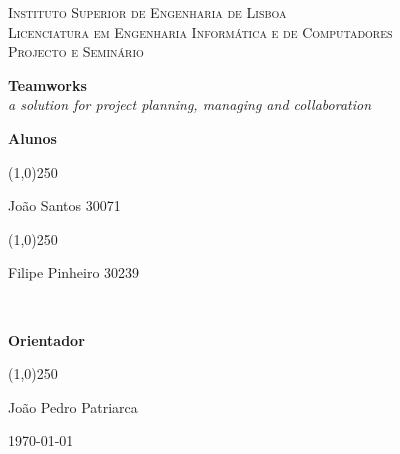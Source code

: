 \documentclass[pdftex,fontsize=20pt,a4paper]{scrbook}
\begin{document}
\begin{titlepage}
\begin{center}
\begin{minipage}{0.8\textwidth}
\begin{center}
\textsc{\scriptsize Instituto Superior de Engenharia de Lisboa}\\
\textsc{\footnotesize Licenciatura em Engenharia Informática e de Computadores }\\[1cm]
\textsc{\footnotesize Projecto e Seminário}\\
\vspace*{1cm}
\end{center}
\end{minipage}
{ \huge\bfseries Teamworks }\\[1cm]
{ \emph{a solution for project planning, managing and collaboration} }\\[2cm]
\begin{minipage}{1\textwidth}
\begin{center}
\textbf{\small{Alunos}}\\
\tiny
\begin{center}
\line(1,0){250}
\end{center}
\vspace{-0.75cm}
João Santos 30071\\
\begin{center}
\line(1,0){250}
\end{center}
\vspace{-0.75cm}
Filipe Pinheiro 30239
\end{center}
\end{minipage}\\[1cm]
\begin{minipage}{1\textwidth}
\begin{center}
\textbf{\small{Orientador}}\\
\tiny
\begin{center}
\line(1,0){250}
\end{center}
\vspace{-0.75cm}
João Pedro Patriarca
\end{center}
\end{minipage}
\vfill
{\footnotesize \today}
\end{center}
\end{titlepage}
\cleardoublepage
\end{document}
